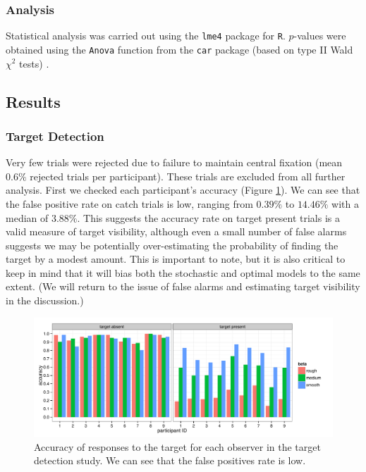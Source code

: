 \documentclass[preprint, authoryear]{elsarticle} %
\begin{document}
\subsubsection{Analysis}

Statistical analysis was carried out using the \texttt{lme4} package for \texttt{R}. $p$-values were obtained using the \texttt{Anova} function from the \texttt{car} package (based on type II Wald $\chi^2$ tests) \citep{fox2010}.

\subsection{Results}

\subsubsection{Target Detection}
\label{sec:targDet}
Very few trials were rejected due to failure to maintain central fixation (mean $0.6\%$ rejected trials per participant). These trials are excluded from all further analysis. First we checked each participant's accuracy (Figure \ref{fig:targDetFalsePositive}). We can see that the false positive rate on catch trials is low, ranging from $0.39\%$ to $14.46\%$ with a median of $3.88\%$. This suggests the accuracy rate on target present trials is a valid measure of target visibility, although even a small number of false alarms suggests we may be potentially over-estimating the probability of finding the target by a modest amount. This is important to note, but it is also critical to keep in mind that it will bias both the stochastic and optimal models to the same extent. (We will return to the issue of false alarms and estimating target visibility in the discussion.)

\begin{figure}
	\centering
	\includegraphics[width=12cm]{fig/targDet/targDetFalsePositive.pdf}
	\caption{Accuracy of responses to the target for each observer in the target detection study. We can see that the false positives rate is low.} 
	\label{fig:targDetFalsePositive}
\end{figure}
\end{document}
